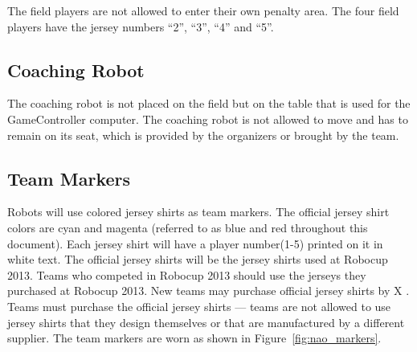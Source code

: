 \documentclass[12pt]{article}
\begin{document}
The field players are not allowed to enter their own penalty area. The four field players have the jersey numbers ``2'', ``3'', ``4'' and ``5''.

\subsection{Coaching Robot}
\label{sec:coaching_robot}

The coaching robot is not placed on the field but on the table that is used for the GameController computer. The coaching robot is not allowed to move and has to remain on its seat, which is provided by the organizers or brought by the team.  

\subsection{Team Markers}
\label{sec:team_markers}

Robots will use colored jersey shirts as team markers. The official jersey shirt colors are cyan and magenta (referred to as blue and red throughout this document).  Each jersey shirt will have a player number(1-5) printed on it in white text.  The official jersey shirts will be the jersey shirts used at Robocup 2013.  Teams who competed in Robocup 2013 should use the jerseys they purchased at Robocup 2013.  New teams may purchase official jersey shirts by X .  Teams must purchase the official jersey shirts --- teams are not allowed to use jersey shirts that they design themselves or that are manufactured by a different supplier.  The team markers are worn as shown in Figure~\ref{fig:nao_markers}.
\end{document}
